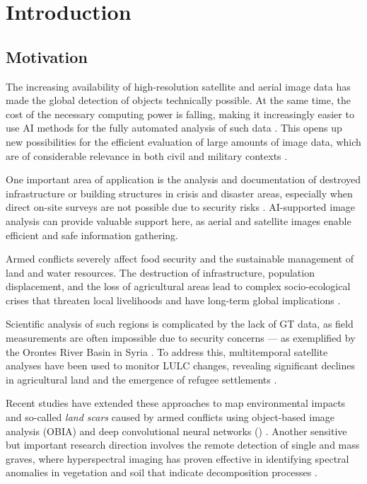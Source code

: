 \chapter{Introduction}
\label{ch:intro}
\section{Motivation}


The increasing availability of high-resolution satellite and aerial image data has made the global detection of objects technically possible. At the same time, the cost of the necessary computing power is falling, making it increasingly easier to use \acrfull{AI} methods for the fully automated analysis of such data \cite{Lemley2017}. This opens up new possibilities for the efficient evaluation of large amounts of image data, which are of considerable relevance in both civil and military contexts \cite{Lemley2017}.
 
One important area of application is the analysis and documentation of destroyed infrastructure or building structures in crisis and disaster areas, especially when direct on-site surveys are not possible due to security risks \cite{Knoth2017}. AI-supported image analysis can provide valuable support here, as aerial and satellite images enable efficient and safe information gathering.

Armed conflicts severely affect food security and the sustainable management of land and water resources. 
The destruction of infrastructure, population displacement, and the loss of agricultural areas lead to complex socio-ecological crises that threaten local livelihoods and have long-term global implications \cite{Mhanna2023}. 

Scientific analysis of such regions is complicated by the lack of \acrfull{GT} data, as field measurements are often impossible due to security concerns — as exemplified by the Orontes River Basin in Syria \cite{Mhanna2023}. 
To address this, multitemporal satellite analyses have been used to monitor \acrfull{LULC} changes, revealing significant declines in agricultural land and the emergence of refugee settlements \cite{Mhanna2023}. 

Recent studies have extended these approaches to map environmental impacts and so-called \emph{land scars} caused by armed conflicts using object-based image analysis (\acrshort{OBIA}) and deep convolutional neural networks () \cite{Feizizadeh2025}. 
Another sensitive but important research direction involves the remote detection of single and mass graves, where hyperspectral imaging has proven effective in identifying spectral anomalies in vegetation and soil that indicate decomposition processes \cite{Kalacska2006,Leblanc2014}.


